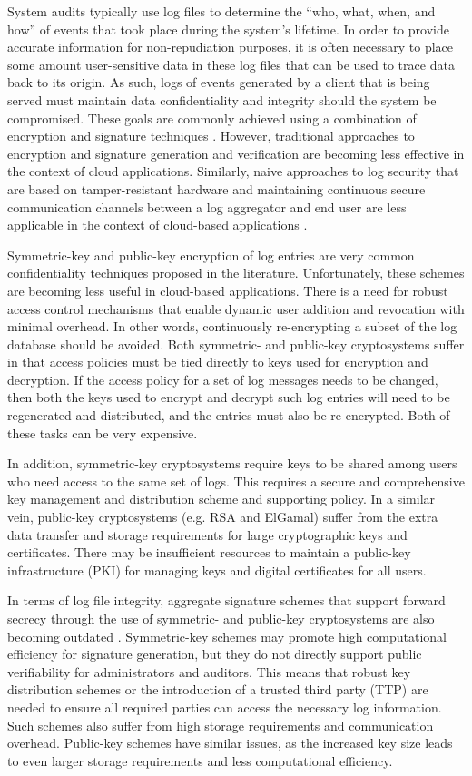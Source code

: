 \documentclass{sig-alternate}
\begin{document}
System audits typically use log files to determine the ``who, what, when, and how'' of events that took 
place during the system's lifetime. In order to provide accurate information for non-repudiation purposes,
it is often necessary to place some amount user-sensitive data in these log files that can be used
to trace data back to its origin. As such, logs of events generated by a client that is being served must
maintain data confidentiality and integrity should the system be compromised. These goals are commonly achieved
using a combination of encryption and signature techniques \cite{Ma2008-FssAgg}. However, traditional approaches to
encryption and signature generation and verification are becoming less effective in the context of cloud
applications. Similarly, naive approaches to log security that are based on tamper-resistant hardware and 
maintaining continuous secure communication channels between a log aggregator and end user are less applicable in 
the context of cloud-based applications \cite{Schneier1999-Secure}. 

Symmetric-key and public-key encryption of log entries are very common confidentiality techniques 
proposed in the literature. Unfortunately, these schemes are becoming less useful in cloud-based applications.
There is a need for robust access control mechanisms that enable dynamic user addition and revocation
with minimal overhead. In other words, continuously re-encrypting a subset of the log database should be avoided. 
Both symmetric- and public-key cryptosystems suffer in that access policies must be tied directly to keys used for
encryption and decryption. If the access policy for a set of log messages needs to be changed, then both the keys used to
encrypt and decrypt such log entries will need to be regenerated and distributed, and the entries must also
be re-encrypted. Both of these tasks can be very expensive. 

In addition, symmetric-key cryptosystems require keys to be shared among users who need access to the 
same set of logs. This requires a secure and comprehensive key management and distribution scheme and
supporting policy. In a similar vein, public-key cryptosystems (e.g. RSA and ElGamal) suffer 
from the extra data transfer and storage requirements for large cryptographic keys and certificates. There 
may be insufficient resources to maintain a public-key infrastructure (PKI) for managing keys and digital 
certificates for all users. 

In terms of log file integrity, aggregate signature schemes that support forward secrecy through the use of 
symmetric- and public-key cryptosystems are also becoming outdated \cite{Yavuz2009-BAF}. 
Symmetric-key schemes may promote high computational efficiency for signature generation, but they 
do not directly support public verifiability for administrators and auditors. This means that robust key 
distribution schemes or the introduction of a trusted third party (TTP) are needed to ensure all required parties 
can access the necessary log information. Such schemes also 
suffer from high storage requirements and communication overhead. Public-key schemes have similar issues, 
as the increased key size leads to even larger storage requirements and less computational efficiency. 
\end{document}
